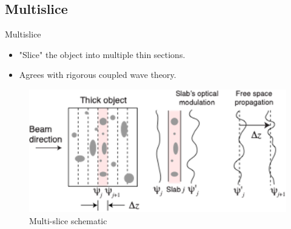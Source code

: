 \documentclass{beamer}
\begin{document}
\subsection{Multislice}
\begin{frame}{Multislice}
		\begin{itemize}
			\item "Slice" the object into multiple thin sections\footnotemark.
			\item Agrees with rigorous coupled wave theory\footnotemark.
		\end{itemize}
		\begin{figure}
			\includegraphics[scale=0.25]{ms}
			\caption{Multi-slice schematic \footnotemark }
		\end{figure}
	
		\addtocounter{footnote}{-2}
		\addtocounter{footnote}{-1}
\end{frame}
\end{document}
